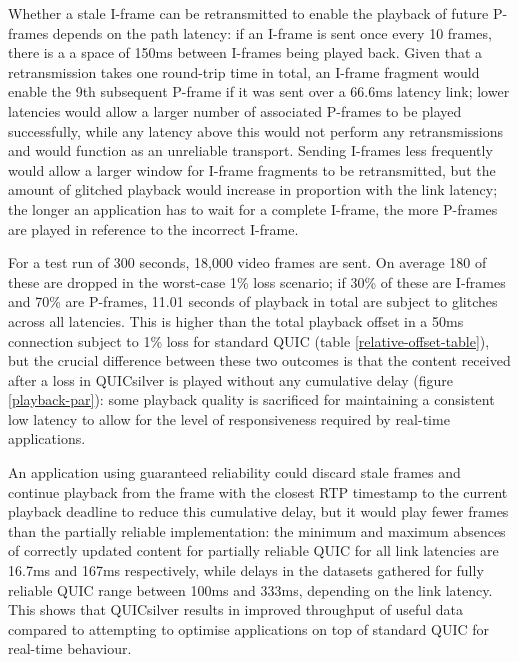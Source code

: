 \documentclass{mpaper}
\begin{document}
Whether a stale I-frame can be retransmitted to enable the playback of future P-frames depends on the path latency: if an I-frame is sent once every 10 frames, there is a a space of 150ms between I-frames being played back. Given that a retransmission takes one round-trip time in total, an I-frame fragment would enable the 9th subsequent P-frame if it was sent over a 66.6ms latency link; lower latencies would allow a larger number of associated P-frames to be played successfully, while any latency above this would not perform any retransmissions and would function as an unreliable transport. Sending I-frames less frequently would allow a larger window for I-frame fragments to be retransmitted, but the amount of glitched playback would increase in proportion with the link latency; the longer an application has to wait for a complete I-frame, the more P-frames are played in reference to the incorrect I-frame.


For a test run of 300 seconds, 18,000 video frames are sent. On average 180 of these are dropped in the worst-case 1\% loss scenario; if 30\% of these are I-frames and 70\% are P-frames, 11.01 seconds of playback in total are subject to glitches across all latencies. This is higher than the total playback offset in a 50ms connection subject to 1\% loss for standard QUIC (table \ref{relative-offset-table}), but the crucial difference between these two outcomes is that the content received after a loss in QUICsilver is played without any cumulative delay (figure \ref{playback-par}): some playback quality is sacrificed for maintaining a consistent low latency to allow for the level of responsiveness required by real-time applications.


An application using guaranteed reliability could discard stale frames and continue playback from the frame with the closest RTP timestamp to the current playback deadline to reduce this cumulative delay, but it would play fewer frames than the partially reliable implementation: the minimum and maximum absences of correctly updated content for partially reliable QUIC for all link latencies are 16.7ms and 167ms respectively, while delays in the datasets gathered for fully reliable QUIC range between 100ms and 333ms, depending on the link latency. This shows that QUICsilver results in improved throughput of useful data compared to attempting to optimise applications on top of standard QUIC for real-time behaviour.

\clearpage
\end{document}
